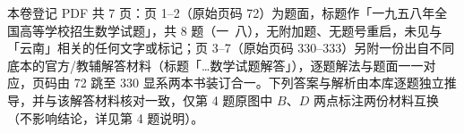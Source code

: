 

\begin{gktip}
本卷登记 PDF 共 7 页：页 1–2（原始页码 72）为题面，标题作「一九五八年全国高等学校招生数学试题」，共 8 题（一~八），无附加题、无题号重启，未见与「云南」相关的任何文字或标记；页 3–7（原始页码 330–333）另附一份出自不同底本的官方/教辅解答材料（标题「…数学试题解答」），逐题解法与题面一一对应，页码由 72 跳至 330 显系两本书装订合一。下列答案与解析由本库逐题独立推导，并与该解答材料核对一致，仅第 4 题原图中 $B$、$D$ 两点标注两份材料互换（不影响结论，详见第 4 题说明）。
\end{gktip}

